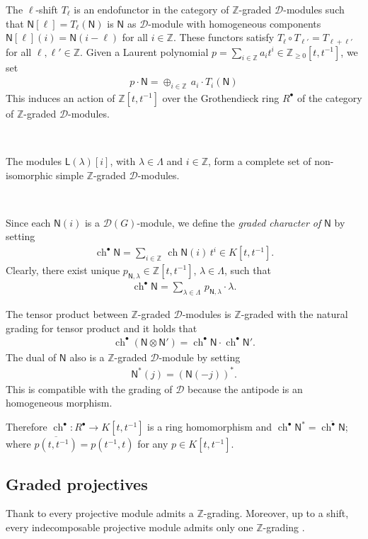\documentclass[reqno]{amsart}
\renewcommand{\_}[1]{_{\left( #1 \right)}}
\renewcommand{\^}[1]{^{\left( #1 \right)}}
\newcommand{\ot}{{\otimes}}
\newcommand\fL{\mathsf{L}}
\newcommand\fN{\mathsf{N}}
\newcommand{\Z}{{\mathbb Z}}
\newcommand{\D}{\mathcal{D}}
\newcommand{\ch}{\operatorname{ch}}
\newcommand{\chgr}{\operatorname{ch}^{\bullet}}
\theoremstyle{plain}
\theoremstyle{definition}
\theoremstyle{remark}
\begin{document}
The $\ell$-shift $T_{\ell}$ is an endofunctor in the category of $\Z$-graded $\D$-modules such that $\fN[\ell]=T_{\ell}(\fN)$ is $\fN$ as $\D$-module with homogeneous components $\fN[\ell](i)=\fN(i-\ell)$ for all $i\in\Z$. These functors satisfy $T_{\ell}\circ T_{\ell'}=T_{\ell+\ell'}$ for all $\ell,\ell'\in\Z$. Given a Laurent polynomial $p=\sum_{i\in\Z}a_it^i\in\Z_{\geq0}[t,t^{-1}]$, we set 
\begin{align*}
p\cdot\fN=\oplus_{i\in\Z}\,a_i\cdot T_i(\fN) 
\end{align*}
This induces an action of $\Z[t,t^{-1}]$ over the Grothendieck ring $R^{\bullet}$ of the category of $\Z$-graded $\D$-modules. 


\

The modules $\fL(\lambda)[i]$, with $\lambda\in\Lambda$ and $i\in\Z$, form a complete set of non-isomorphic simple $\Z$-graded $\D$-modules. 

\

Since each $\fN(i)$ is a $\D(G)$-module, we define the {\it graded character of} $\fN$ by setting
\begin{align}\label{eq:chgr}
\chgr\fN=\sum_{i\in\Z}\,\ch \fN(i)\,t^i\in K[t,t^{-1}].
\end{align}
Clearly, there exist unique $p_{\fN,\lambda}\in\Z[t,t^{-1}]$, $\lambda\in\Lambda$, such that
\begin{align}\label{eq:chgr en base lambda}
\chgr\fN=\sum_{\lambda\in\Lambda}\,p_{\fN,\lambda}\cdot\lambda.
\end{align}

The tensor product between $\Z$-graded $\D$-modules is $\Z$-graded with the natural grading for tensor product and it holds that
\begin{align}\label{eq:chgr of ot}
\chgr(\fN\ot\fN')=\chgr\fN\cdot\chgr\fN'.
\end{align}
The dual of $\fN$ also is a $\Z$-graded $\D$-module by setting 
\begin{align*}
\fN^*(j)=(\fN(-j))^*. 
\end{align*}
This is compatible with the grading of $\D$ because the antipode is an homogeneous morphism. 

Therefore $\chgr:R^\bullet\longrightarrow K[t,t^{-1}]$ is a ring homomorphism and $\chgr\fN^*=\overline{\chgr\fN}$; where $\overline{p(t,t^{-1})}=p(t^{-1},t)$ for any $p\in K[t,t^{-1}]$.



\subsection{Graded projectives} Thank to \cite[Corollary 3.4]{MR659212} every projective module admits a $\Z$-grading. Moreover, up to a shift, every indecomposable projective module admits  only one $\Z$-grading \cite[Theorem 4.1]{MR659212}. 
\end{document}
